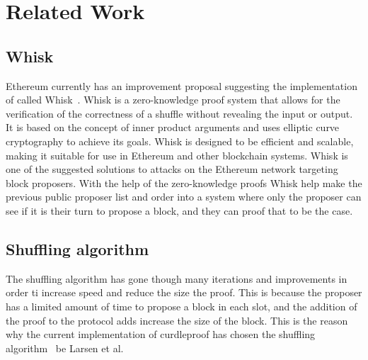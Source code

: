 \section{Related Work}\label{sec:related-work}




\subsection{Whisk}\label{sec:related-work-whisk}
Ethereum currently has an improvement proposal suggesting the implementation of called Whisk~\cite{Whisk2024}.
Whisk is a zero-knowledge proof system that allows for the verification of the correctness of a shuffle without revealing the input or output.
It is based on the concept of inner product arguments and uses elliptic curve cryptography to achieve its goals.
Whisk is designed to be efficient and scalable, making it suitable for use in Ethereum and other blockchain systems.
Whisk is one of the suggested solutions to attacks on the Ethereum network targeting block proposers.
With the help of the zero-knowledge proofs Whisk help make the previous public proposer list and order into a system where only the proposer can see if it is their turn to propose a block, and they can proof that to be the case.


\subsection{Shuffling algorithm}\label{sec:related-work-Shuffling-algorithm}
The shuffling algorithm has gone though many iterations and improvements in order ti increase speed and reduce the size the proof.
This is because the proposer has a limited amount of time to propose a block in each slot, and the addition of the proof to the protocol adds increase the size of the block.
This is the reason why the current implementation of curdleproof has chosen the shuffling algorithm~\cite{cryptoeprint:2022/560} be Larsen et al.

